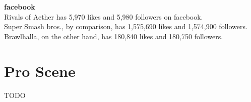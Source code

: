 \documentclass{article}
\begin{document}
\textbf{facebook}\\

Rivals of Aether has 5,970 likes and 5,980 followers on facebook. \cite{fb:11}\\
Super Smash bros., by comparison, has 1,575,690 likes and 1,574,900 followers. \cite{fbs:12}\\
Brawlhalla, on the other hand, has 180,840 likes and 180,750 followers.\cite{fbb:13}\\

\chapter{Pro Scene}

TODO\\

\newpage


\end{document}
